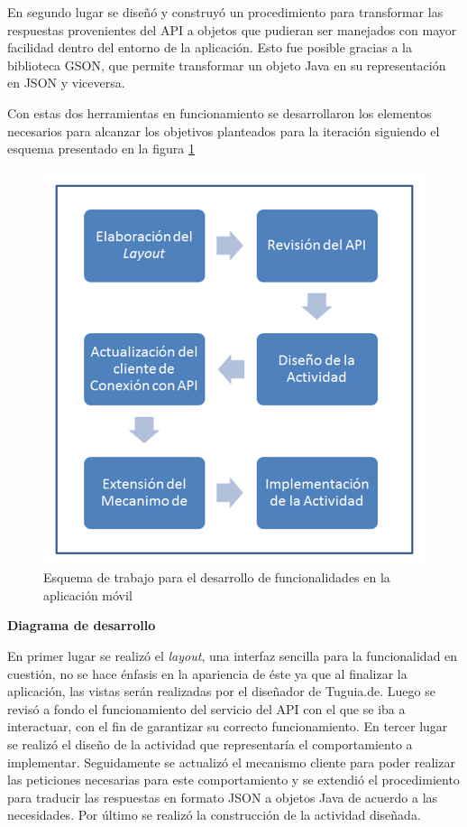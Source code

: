 En segundo lugar se diseñó y construyó un procedimiento para transformar las respuestas provenientes del API a objetos que pudieran ser manejados con mayor facilidad dentro del entorno de la aplicación. Esto fue posible gracias a la biblioteca GSON, que permite transformar un objeto Java en su representación en JSON y viceversa.

Con estas dos herramientas en funcionamiento se desarrollaron los elementos necesarios para alcanzar los objetivos planteados para la iteración siguiendo el esquema presentado en la figura \ref{img:diagrama_flujo} 

\begin{figure}[h]
	\begin{center}
		\includegraphics[scale=0.4]{imagenes/diagrama.png}
	\end{center}
	\caption{
		\label{img:diagrama_flujo}
		Esquema de trabajo para el desarrollo de funcionalidades en la aplicación móvil
	}
\end{figure}

\textbf{Diagrama de desarrollo}

En primer lugar se realizó el \textit{layout}, una interfaz sencilla para la funcionalidad en cuestión, no se hace énfasis en la apariencia de éste ya que al finalizar la aplicación, las vistas serán realizadas por el diseñador de Tuguia.de. Luego se revisó a fondo el funcionamiento del servicio del API con el que se iba a interactuar, con el fin de garantizar su correcto funcionamiento. En tercer lugar se realizó el diseño de la actividad que representaría el comportamiento a implementar. Seguidamente se actualizó el mecanismo cliente para poder realizar las peticiones necesarias para este comportamiento y se extendió el procedimiento para traducir las respuestas en formato JSON a objetos Java de acuerdo a las necesidades. Por último se realizó la construcción de la actividad diseñada.

